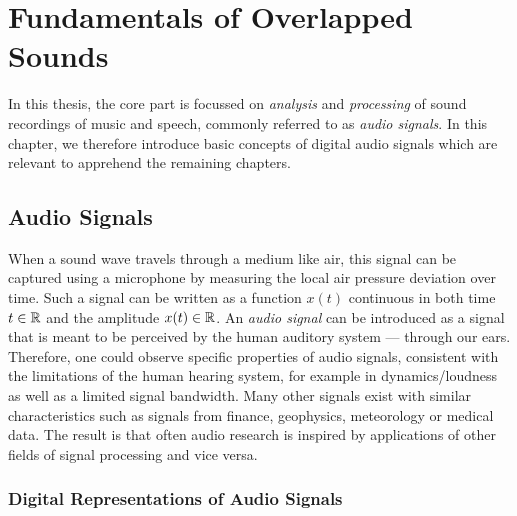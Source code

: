\hypertarget{Fundamentals of Overlapped Sounds}{%
\chapter{Fundamentals of Overlapped Sounds}\label{cha:fundamentals}}

In this thesis, the core part is focussed on \emph{analysis} and \emph{processing} of sound recordings of music and speech, commonly referred to as \emph{audio signals}.
In this chapter, we therefore introduce basic concepts of digital audio signals which are relevant to apprehend the remaining chapters.

\hypertarget{Audio Signals}{%
\section{Audio Signals}\label{sec:specifics-of-audio-signals}}

When a sound wave travels through a medium like air, this signal can be captured using a microphone by measuring the local air pressure deviation over time.
Such a signal can be written as a function \(x(t)\) continuous in both time \(t \in {\mathbb{R}}\) and the amplitude \(x(t) \in {\mathbb{R}}\).
An \emph{audio signal} can be introduced as a signal that is meant to be perceived by the human auditory system --- through our ears.
Therefore, one could observe specific properties of audio signals, consistent with the limitations of the human hearing system, for example in dynamics/loudness as well as a limited signal bandwidth.
Many other signals exist with similar characteristics such as signals from finance, geophysics, meteorology or medical data.
The result is that often audio research is inspired by applications of other fields of signal processing and vice versa.

\hypertarget{digital-representations-of-audio-signals}{%
\subsection{Digital Representations of Audio
Signals}\label{digital-representations-of-audio-signals}}

